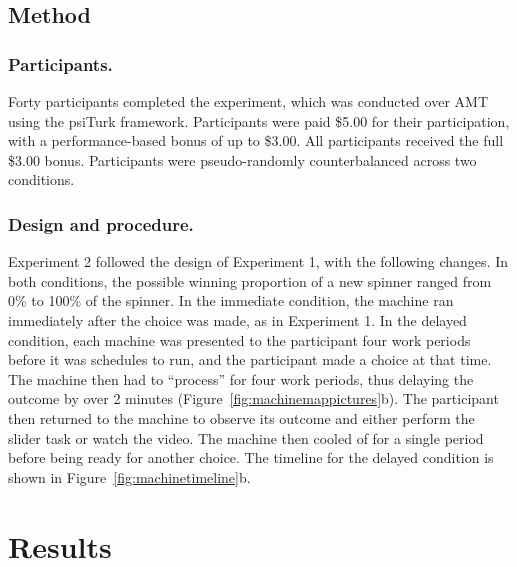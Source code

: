 \documentclass[10pt,letterpaper]{article}
\begin{document}
\subsection{Method}

\subsubsection{Participants.}

Forty participants completed the experiment, which was conducted over
AMT using the psiTurk framework.
Participants were paid \$5.00 for their participation, with a performance-based
bonus of up to \$3.00. All participants received the full \$3.00 bonus.
Participants were pseudo-randomly counterbalanced across two conditions.

\subsubsection{Design and procedure.}

Experiment 2 followed the design of Experiment 1, with the following changes. In
both conditions, the possible winning proportion of a new spinner ranged from 0\% to 100\% of
the spinner. In the immediate condition, the machine ran immediately after the
choice was made, as in Experiment 1. In the delayed condition, each machine was
presented to the participant four work periods before it was schedules to run,
and the participant made a choice at that time. The machine then had to
``process'' for four work periods, thus delaying
the outcome by over 2 minutes (Figure~\ref{fig:machinemappictures}b). The participant then returned to the
machine to observe its outcome and either perform the slider task or
watch the video. The machine then cooled of for a single period before being
ready for another choice. The timeline for the delayed condition is shown in
Figure~\ref{fig:machinetimeline}b.

\section{Results}
\end{document}
